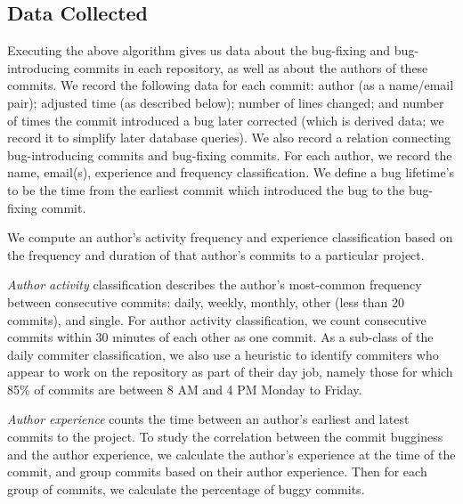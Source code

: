 \subsection{Data Collected}
\label{sec:data}
Executing the above algorithm gives us data about the bug-fixing
and bug-introducing commits
in each repository, as well as about the authors of these commits.  
We record the following data for each commit: author (as a name/email
pair); adjusted time (as described below); number of lines changed; 
and number of times the
commit introduced a bug later corrected (which is derived data; we
record it to simplify later database queries). We also record a
relation connecting bug-introducing commits and bug-fixing
commits. For each author, we record the name, email(s), experience and
frequency classification. We define a bug lifetime's to be the time from the
earliest commit which introduced the bug to the bug-fixing commit.


We compute an author's activity frequency and experience classification based on the
frequency and duration of that author's commits to a particular
project. 

{\em Author activity} classification
describes the author's most-common frequency between consecutive
commits: daily, weekly, monthly, other (less than 20 commits), and
single. For author activity classification, we count consecutive
commits within 30 minutes of each other as one commit. As a sub-class
of the daily commiter classification, we also use a heuristic to
identify commiters who appear to work on the repository as part of
their day job, namely those for which 85\% of commits are between 8 AM
and 4 PM Monday to Friday.

{\em Author experience} counts the time between an author's
earliest and latest commits to the project. 
To study the correlation between the commit bugginess and 
the author experience, we calculate the author's experience at the time of the commit, 
and group commits based on their author experience. 
Then for each group of commits, we calculate the percentage of buggy commits. 
 

